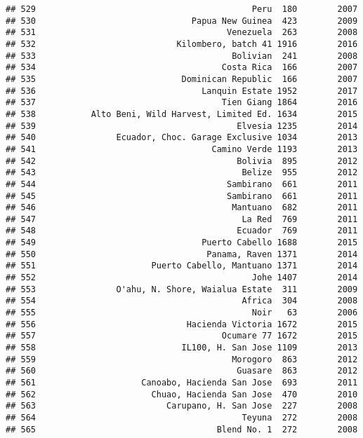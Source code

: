 \documentclass[
]{article}
\begin{document}
\begin{verbatim}
## 529                                           Peru  180        2007
## 530                               Papua New Guinea  423        2009
## 531                                      Venezuela  263        2008
## 532                            Kilombero, batch 41 1916        2016
## 533                                       Bolivian  241        2008
## 534                                     Costa Rica  166        2007
## 535                             Dominican Republic  166        2007
## 536                                 Lanquin Estate 1952        2017
## 537                                     Tien Giang 1864        2016
## 538           Alto Beni, Wild Harvest, Limited Ed. 1634        2015
## 539                                        Elvesia 1235        2014
## 540                Ecuador, Choc. Garage Exclusive 1034        2013
## 541                                   Camino Verde 1193        2013
## 542                                        Bolivia  895        2012
## 543                                         Belize  955        2012
## 544                                      Sambirano  661        2011
## 545                                      Sambirano  661        2011
## 546                                       Mantuano  682        2011
## 547                                         La Red  769        2011
## 548                                        Ecuador  769        2011
## 549                                 Puerto Cabello 1688        2015
## 550                                  Panama, Raven 1371        2014
## 551                       Puerto Cabello, Mantuano 1371        2014
## 552                                           Johe 1407        2014
## 553                O'ahu, N. Shore, Waialua Estate  311        2009
## 554                                         Africa  304        2008
## 555                                           Noir   63        2006
## 556                              Hacienda Victoria 1672        2015
## 557                                     Ocumare 77 1672        2015
## 558                             IL100, H. San Jose 1109        2013
## 559                                       Morogoro  863        2012
## 560                                        Guasare  863        2012
## 561                     Canoabo, Hacienda San Jose  693        2011
## 562                       Chuao, Hacienda San Jose  470        2010
## 563                          Carupano, H. San Jose  227        2008
## 564                                         Teyuna  272        2008
## 565                                    Blend No. 1  272        2008

\end{verbatim}
\end{document}
